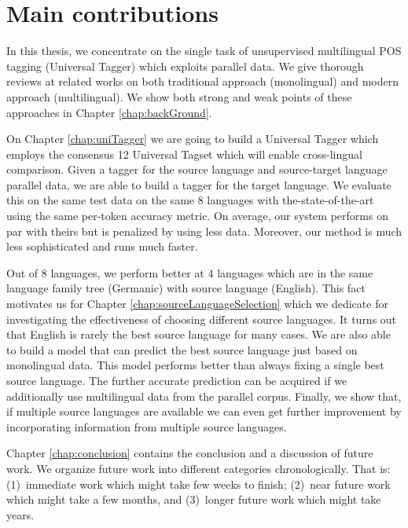 \section{Main contributions}
In this thesis, we concentrate on the single task of unsupervised multilingual POS tagging (Universal  Tagger) which exploits parallel data. We give thorough reviews at related works on both traditional approach (monolingual) and modern approach (multilingual). We show both strong and weak points of these approaches in Chapter \ref{chap:backGround}. 

On Chapter \ref{chap:uniTagger} we are going to build a Universal Tagger which employs the consensus 12 Universal Tagset \cite{UniversalTagSet} which will enable cross-lingual comparison. Given a tagger for the source language and source-target language parallel data, we are able to build a tagger for the target language. We evaluate this on the same test data on the same 8 languages with the-state-of-the-art~\cite{Das:2011} using the same per-token accuracy metric. On average, our system performs on par with theirs but is penalized by using less data. Moreover, our method is much less sophisticated and runs much faster. 

Out of 8 languages, we perform better at 4 languages which are in the same language family tree (Germanic) with source language (English). This fact motivates us for Chapter \ref{chap:sourceLanguageSelection} which we dedicate for investigating the effectiveness of choosing different source languages. It turns out that English is rarely the best source language for many cases. We are also able to build a model that can predict the best source language just based on monolingual data. This model performs better than always fixing a single best source language. The further accurate prediction can be acquired if we additionally use multilingual data from the parallel corpus. Finally, we show that, if multiple source languages are available we can even get further improvement by incorporating information from multiple source languages.

Chapter \ref{chap:conclusion} contains the conclusion and a discussion of future work. We organize future work into different categories chronologically. That is: (1)~immediate work which might take few weeks to finish; (2)~near future work which might take a few months, and (3)~longer future work which might take years. 
